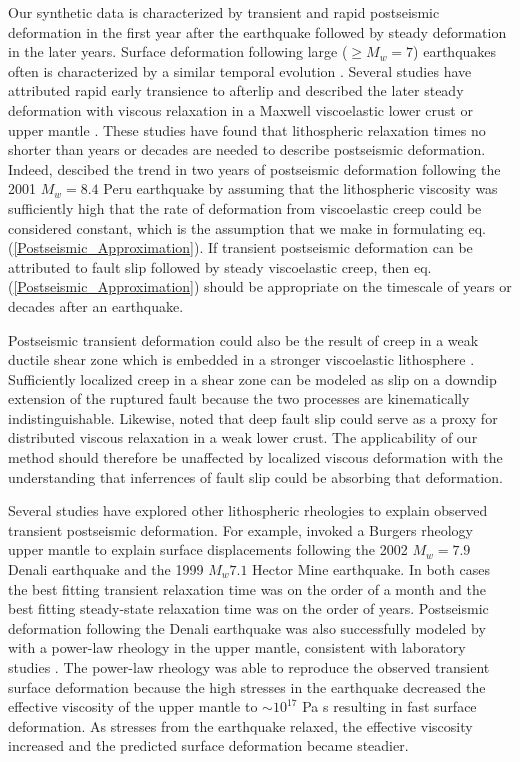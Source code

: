 \documentclass[extra,mreferee]{gji}
\begin{document}
Our synthetic data is characterized by transient and rapid postseismic
deformation in the first year after the earthquake followed by steady
deformation in the later years.  Surface deformation following large
($\geq M_w=7$) earthquakes often is characterized by a similar
temporal evolution \citep[e.g.][]{SS1997,S2005,E2009}.  Several
studies have attributed rapid early transience to afterlip and
described the later steady deformation with viscous relaxation in a
Maxwell viscoelastic lower crust or upper mantle
\citep[e.g.][]{PA2005,J2009,H2009,F2006,R2015}.  These studies have
found that lithospheric relaxation times no shorter than years or
decades are needed to describe postseismic deformation.  Indeed,
\citet{PA2005} descibed the trend in two years of postseismic
deformation following the 2001 $M_w=8.4$ Peru earthquake by assuming
that the lithospheric viscosity was sufficiently high that the rate of
deformation from viscoelastic creep could be considered constant,
which is the assumption that we make in formulating
eq. (\ref{Postseismic_Approximation}). If transient postseismic
deformation can be attributed to fault slip followed by steady
viscoelastic creep, then eq. (\ref{Postseismic_Approximation}) should
be appropriate on the timescale of years or decades after an
earthquake.

Postseismic transient deformation could also be the result of creep in
a weak ductile shear zone which is embedded in a stronger viscoelastic
lithosphere \citep[e.g][]{HZ2014}. Sufficiently localized creep in a
shear zone can be modeled as slip on a downdip extension of the
ruptured fault \citep[e.g.][]{H2002,KS2003,JS2004} because the two
processes are kinematically indistinguishable.  Likewise,
\citet{F2006} noted that deep fault slip could serve as a proxy for
distributed viscous relaxation in a weak lower crust. The
applicability of our method should therefore be unaffected by
localized viscous deformation with the understanding that inferrences
of fault slip could be absorbing that deformation.

Several studies have explored other lithospheric rheologies to explain
observed transient postseismic deformation.  For example,
\citet{P2003,P2005} invoked a Burgers rheology upper mantle to explain
surface displacements following the 2002 $M_w=7.9$ Denali earthquake
and the 1999 $M_w7.1$ Hector Mine earthquake.  In both cases the best
fitting transient relaxation time was on the order of a month and the
best fitting steady-state relaxation time was on the order of years.
Postseismic deformation following the Denali earthquake was also
successfully modeled by \citet{F2006b} with a power-law rheology in
the upper mantle, consistent with laboratory studies
\citep[e.g.][]{KK1987}.  The power-law rheology was able to reproduce
the observed transient surface deformation because the high stresses
in the earthquake decreased the effective viscosity of the upper
mantle to $\sim10^{17}$ Pa s resulting in fast surface deformation.  As
stresses from the earthquake relaxed, the effective viscosity
increased and the predicted surface deformation became steadier.
\end{document}
